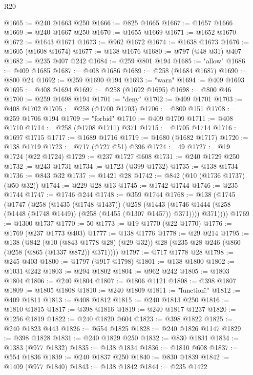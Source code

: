 \begin{lexlean}{R20}
\begin{coremodule}
@1665 := @240 @1663 @250
@1666 := @825 @1665
@1667 := @1657 @1666
@1669 := @240 @1667 @250
@1670 := @1655 @1669
@1671 := @1652 @1670
@1672 := @1643 @1671
@1673 := @962 @1672
@1674 := @1638 @1673
@1676 := @1605 (@1608 @1674)
@1677 := @138 @1676
@1680 := @797 (@48 @31) @407
@1682 := @235 @407 @242
@1684 := @259 @801 @194
@1685 := "allow"
@1686 := @409 @1685
@1687 := @408 @1686
@1689 := @258 (@1684 @1687)
@1690 := @800 @24
@1692 := @259 @1690 @194
@1693 := "warn"
@1694 := @409 @1693
@1695 := @408 @1694
@1697 := @258 (@1692 @1695)
@1698 := @800 @46
@1700 := @259 @1698 @194
@1701 := "deny"
@1702 := @409 @1701
@1703 := @408 @1702
@1705 := @258 (@1700 @1703)
@1706 := @800 @151
@1708 := @259 @1706 @194
@1709 := "forbid"
@1710 := @409 @1709
@1711 := @408 @1710
@1714 := @258 (@1708 @1711) @371
@1715 := @1705 @1714
@1716 := @1697 @1715
@1717 := @1689 @1716
@1719 := @1680 (@1682 @1717)
@1720 := @138 @1719
@1723 := @717 (@727 @51) @396
@1724 := 49
@1727 := @19 @1724 (@22 @1724)
@1729 := @237 @1727 @608
@1731 := @240 @1729 @250
@1732 := @243 @1731
@1734 := @1723 (@399 @1732)
@1735 := @138 @1734
@1736 := @843 @32
@1737 := @1421 @28
@1742 := @842 (@10 (@1736 @1737) (@50 @32))
@1744 := @229 @28 @13
@1745 := @1742 @1744
@1746 := @235 @1744
@1747 := @1746 @244
@1748 := @359 @1744
@1768 := @138
    (@1745
      (@1747
        (@258
          (@1435 (@1748 @1437))
          (@258
            (@1443 (@1746 @1444 (@258 (@1448 (@1748 @1449)) (@258 (@1455 (@1307 @1457)) @371))))
            @371))))
@1769 := @1300 @1737
@1770 := 50
@1773 := @19 @1770 (@22 @1770)
@1776 := @1769 (@237 @1773 @403)
@1777 := @138 @1776
@1778 := @29 @214
@1795 := @138
    (@842
      (@10 (@843 @1778 @28) (@29 @32))
      @28
      (@235 @28 @246 (@860 (@258 (@865 (@1337 @872)) @371))))
@1797 := @717 @1778 @28
@1798 := @245 @403
@1800 := @1797 (@917 @1798)
@1801 := @138 @1800
@1802 := @1031 @242
@1803 := @294 @1802
@1804 := @962 @242
@1805 := @1803 @1804
@1806 := @240 @1804
@1807 := @1806 @1121
@1808 := @398 @1807
@1809 := @1805 @1808
@1810 := @240 @1809
@1811 := "{\"function\":"
@1812 := @409 @1811
@1813 := @408 @1812
@1815 := @240 @1813 @250
@1816 := @1810 @1815
@1817 := @398 @1816
@1819 := @240 @1817 @1237
@1820 := @1256 @1819
@1822 := @240 @1820 @604
@1823 := @398 @1822
@1825 := @240 @1823 @443
@1826 := @554 @1825
@1828 := @240 @1826 @1147
@1829 := @398 @1828
@1831 := @240 @1829 @250
@1832 := @830 @1831
@1834 := @1383 (@977 @1832)
@1835 := @138 @1834
@1836 := @1810 @608
@1837 := @554 @1836
@1839 := @240 @1837 @250
@1840 := @830 @1839
@1842 := @1409 (@977 @1840)
@1843 := @138 @1842
@1844 := @235 @1422
}
\end{coremodule}
\end{lexlean}
